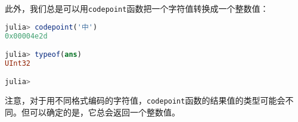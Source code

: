 此外，我们总是可以用\verb`codepoint`函数把一个字符值转换成一个整数值：
\begin{lstlisting}[language=julia]
julia> codepoint('中')
0x00004e2d

julia> typeof(ans)
UInt32

julia> 
\end{lstlisting}

注意，对于用不同格式编码的字符值，\verb`codepoint`函数的结果值的类型可能会不同。但可以确定的是，它总会返回一个整数值。
